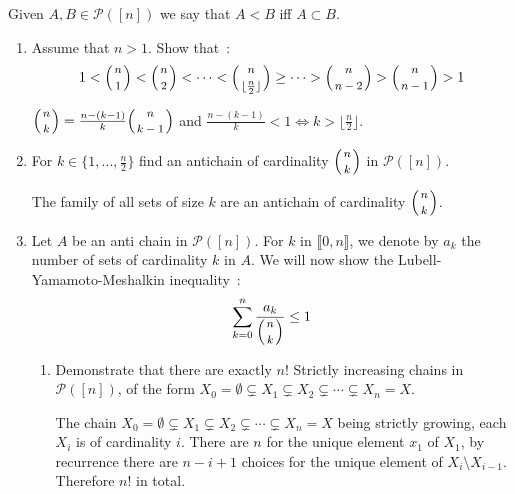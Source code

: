 \documentclass[a4paper,11pt]{exam}
\renewcommand{\binom}{\mbinom}
\begin{document}
\begin{questions}
		\question Given $A,B\in\mathcal{P}([n])$ we say that $A<B$ iff $A\subset B$. 
		
		
		
		\begin{enumerate}
			\item Assume that $n>1$. 
			Show that~:
			\[
			1 < \binom{n}{1} < \binom{n}{2} < \cdots <
			\binom{n}{\lfloor \frac{n}{2}\rfloor} \geq \cdots >
			\binom{n}{n-2} > \binom{n}{n-1} > 1
			\]
			
			\begin{solution}
				$\binom{n}{k} = \frac{n-(k-1)}{k}\binom{n}{k-1}$ and
				$\frac{n-(k-1)}{k} < 1 \iff k > \lfloor \frac{n}{2} \rfloor$.
			\end{solution}
			
			\item For $k \in\{1,...,\frac{n}{2}\}$ find an antichain of cardinality $\binom{n}{k}$ in $ \mathcal{P}([n])$.
			
			\begin{solution}
				The family of all sets of size $k$ are an antichain of cardinality
				$\binom{n}{k}$.
			\end{solution}
			
			\item Let $A$ be an anti chain in $ \mathcal{P}([n])$. For $k$ in $\llbracket 0,n\rrbracket$, we denote by $ a_k $ the number of sets of cardinality $k$ in $ A $.
			We will now show the Lubell-Yamamoto-Meshalkin inequality~:
			\[
			\sum_{k=0}^n \frac{a_k}{\binom{n}{k}} \leq 1
			\]
			
			\begin{enumerate}
				\item Demonstrate that there are exactly $ n! $ Strictly increasing chains in $ \mathcal{P}([n])$, of the form $X_0 = \emptyset \subsetneq X_1
				\subsetneq X_2 \subsetneq \cdots \subsetneq X_n=X$.
				
				\begin{solution}
					The chain $X_0 = \emptyset \subsetneq X_1 \subsetneq X_2 \subsetneq
					\cdots \subsetneq X_n=X$ being strictly growing, each $X_i$
					is of cardinality $i$. 
					There are $n$ for the unique element $x_1$ of $X_1$, by recurrence there  are $n-i+1$ choices for the unique  element of $X_i \setminus
					X_{i-1}$.
					Therefore $n!$ in total.
				\end{solution}
				

\end{enumerate}
\end{enumerate}
\end{questions}
\end{document}
